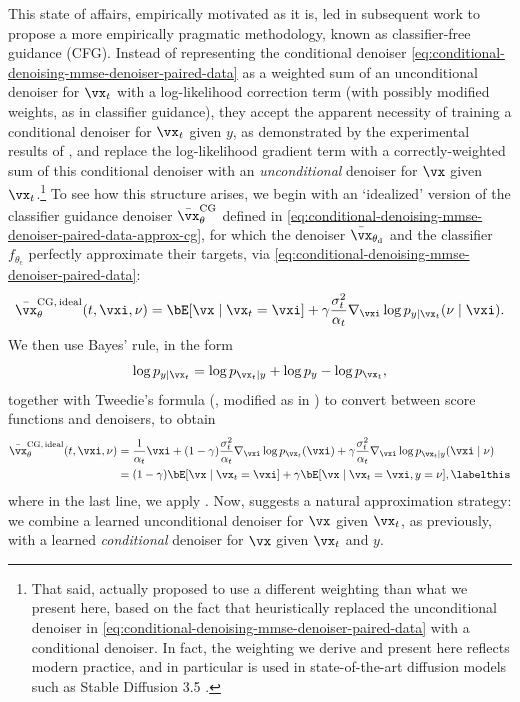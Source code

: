 \documentclass[../../book-main.tex]{subfiles}
\begin{document}
This state of affairs, empirically motivated as it is, led \citet{Ho2022-ry} in
subsequent work to propose a more empirically pragmatic methodology, known as
classifier-free guidance (CFG). Instead of representing the conditional denoiser
\eqref{eq:conditional-denoising-mmse-denoiser-paired-data} as a weighted sum
of an unconditional denoiser for $\vx_t$ with a log-likelihood correction term
(with possibly modified weights, as in classifier guidance), they accept the
apparent necessity of training a conditional denoiser for $\vx_t$ given $y$, as
demonstrated by the experimental results of \citet{Dhariwal2021-hg}, and replace 
the log-likelihood gradient term with a correctly-weighted sum of this
conditional denoiser with an \textit{unconditional} denoiser for $\vx$ given
$\vx_t$.\footnote{That said, \textcite{Ho2022-ry} actually proposed to use
a different weighting than what we present here, based on the fact that
\textcite{Dhariwal2021-hg} heuristically replaced the unconditional denoiser in
\eqref{eq:conditional-denoising-mmse-denoiser-paired-data} with
a conditional denoiser. In fact, the weighting we derive and present here
reflects modern practice, and in particular is used in state-of-the-art
diffusion models such as Stable Diffusion 3.5
\cite{DBLP:conf/icml/EsserKBEMSLLSBP24}.} To see how this structure arises, we
begin with an `idealized' version of the classifier guidance denoiser
$\bar{\vx}_{\theta}^{\mathrm{CG}}$ defined in
\eqref{eq:conditional-denoising-mmse-denoiser-paired-data-approx-cg},
for which the denoiser $\bar{\vx}_{\theta_{\mathrm{d}}}$ and the classifier
$f_{\theta_{\mathrm{c}}}$ perfectly approximate their targets, via
\eqref{eq:conditional-denoising-mmse-denoiser-paired-data}:
\begin{equation}\label{eq:conditional-denoising-mmse-denoiser-paired-data-exact-cg}
  \bar{\vx}_{\theta}^{\mathrm{CG,\,ideal}}(t, \vxi, \nu)
  =
  \bE[\vx \mid \vx_t=\vxi]
  + \gamma\frac{\sigma_t^2}{\alpha_t}
  \nabla_{\vxi}\log p_{y \mid \vx_t}(\nu\mid \vxi).
\end{equation}
We then use Bayes' rule, in the form
\begin{equation}
  \log p_{y \mid \vx_t}
  =
  \log p_{\vx_t \mid y} + \log p_{y} - \log p_{\vx_t},
\end{equation}
together with Tweedie's formula (, modified as in
) to convert between score functions and denoisers,
to obtain
\begin{align*}
  \bar{\vx}_{\theta}^{\mathrm{CG,\,ideal}}(t, \vxi, \nu)
  &=
  \frac{1}{\alpha_t} \vxi 
  + (1-\gamma) \frac{\sigma_t^2}{\alpha_t} 
  \nabla_{\vxi}\log p_{\vx_t}(\vxi)
  + \gamma \frac{\sigma_t^2}{\alpha_t} 
  \nabla_{\vxi}\log p_{\vx_t \mid y}(\vxi \mid \nu)
  \\
  &=
  (1 - \gamma) \bE[\vx \mid \vx_t=\vxi]
  +
  \gamma \bE[\vx \mid \vx_t=\vxi, y=\nu],
  \labelthis\label{eq:ideal-cfg-denoiser}
\end{align*}
where in the last line, we apply
.
Now,  suggests a natural approximation strategy: we
combine a learned unconditional denoiser for $\vx$ given $\vx_t$, as previously,
with a learned \textit{conditional} denoiser for $\vx$ given $\vx_t$ and $y$.
\end{document}
